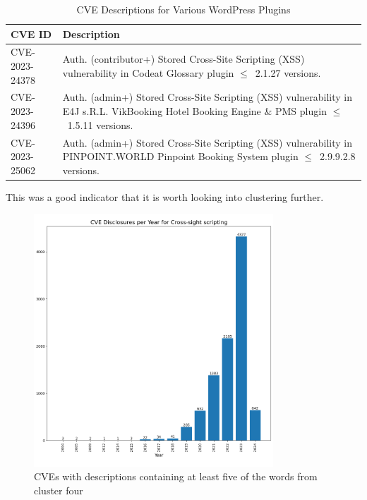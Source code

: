 \documentclass[12pt]{article}
\begin{document}
\begin{table}[h]
	\centering
	\begin{tabular}{|p{}|p{}|}
		\hline
		\textbf{CVE ID} & \textbf{Description}                                                    \\
		\hline

		CVE-2023-24378  & Auth. (contributor+) Stored Cross-Site Scripting (XSS) vulnerability in
		Codeat Glossary plugin $\leq$~2.1.27 versions.                                            \\

		\hline

		CVE-2023-24396  & Auth. (admin+) Stored Cross-Site Scripting (XSS) vulnerability in E4J
		s.R.L. VikBooking Hotel Booking Engine \& PMS plugin $\leq$~1.5.11 versions.              \\

		\hline

		CVE-2023-25062  & Auth. (admin+) Stored Cross-Site Scripting (XSS) vulnerability in
		PINPOINT.WORLD Pinpoint Booking System plugin $\leq$~2.9.9.2.8 versions.                  \\

		\hline
	\end{tabular}
	\caption{CVE Descriptions for Various WordPress Plugins}
	\label{tab:cve-descriptions}
\end{table}

This was a good indicator that it is worth looking into clustering further.

\begin{figure}[H]
	\centering

	\includegraphics[width=0.8\textwidth]{figures/cross_site_per_year.png}
	\caption{\label{fig:cross_site_per_year}CVEs with descriptions containing at least five of the
		words from cluster four}
\end{figure}
\end{document}
